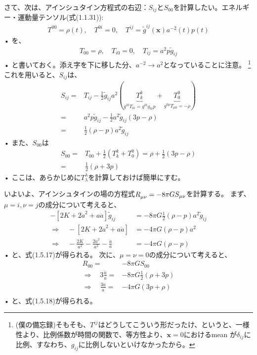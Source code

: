 \documentclass[11pt,a4paper,dvipdfmx]{jsarticle}
\theoremstyle{plain}
\theoremstyle{break}
\begin{document}
さて、次は、アインシュタイン方程式の右辺：$S_{ij}$と$S_{00}$を計算したい。エネルギー・運動量テンソル(式(1.1.31)):
\begin{align}
 T^{00}=\rho(t), \quad T^{0 i}=0, \quad T^{i j}=\tilde{g}^{i j}(\mathbf{x}) a^{-2}(t) p(t)
\end{align}•%
を、
\begin{align}
 T_{00}=\rho, \quad T_{i 0}=0, \quad T_{i j}=a^{2} p \tilde{g}_{i j}
\end{align}•%
と書いておく。添え字を下に移した分、$a^{-2} \rightarrow a^2$となっていることに注意。
\footnote{(僕の備忘録)そもそも、$T^{ij}$はどうしてこういう形だったけ、というと、一様性より、比例係数が時間の関数で、等方性より、$\mathbf{x}=0$におけるmean が$\delta_{ij}$に比例、すなわち、$g_{ij}$に比例しないといけなかったから。}
\\これを用いると、$S_{ij}$は、
\begin{align}
 S_{i j}
 	=&T_{i j}-\frac{1}{2} \tilde{g}_{i j} a^{2}(\underbrace{T_{k}^{k}}_{g^{ik} T_{ki} =g^{ik} g_{ki} p }+\underbrace{T_{0}^{0}}_{g^{0\mu}T_{\mu 0}=- \rho } )\\
 	=&a^{2} p \tilde{g}_{i j}-\frac{1}{2} a^{2} \tilde{g}_{i j}(3 p-\rho)\\
	=&\frac{1}{2}(\rho-p) a^{2} \tilde{g}_{i j}
\end{align}•%
また、$S_{00}$は
\begin{align}
 S_{00}
 	=&T_{00}+\frac{1}{2}\left(T_{k}^{k}+T_{0}^{0}\right)
	=\rho+\frac{1}{2}(3 p-\rho)\\
	=&\frac{1}{2}(\rho+3 p)
\end{align}•%
ここは、あらかじめに$T^\lambda_{\lambda}$を計算しておけば簡単にすむ。

いよいよ、アインシュタインの場の方程式$\tensor{R}{_{\mu \nu}} = -8\pi G S_{\mu \nu}$を計算する。
まず、$\mu = i ,\nu = j$の成分について考えると、
\begin{align}
  -\left[2 K+2 \dot{a}^{2}+a \ddot{a}\right] \tilde{g}_{i j} &=-8\pi G \frac{1}{2}(\rho-p) a^{2} \tilde{g}_{i j} \\
   \Rightarrow  \quad -\left[2 K+2 \dot{a}^{2}+a \ddot{a}\right] &=-4\pi G (\rho-p) a^{2}  \\
   \Rightarrow  \quad -\frac{2 K}{a^{2}}-\frac{2 \dot{a}^{2}}{a^{2}}-\frac{\ddot{a}}{a}&=-4 \pi G(\rho-p)
\end{align}•%
と、式(1.5.17)が得られる。
次に、$\mu = \nu = 0$の成分について考えると、
\begin{align}
  R_{00} =& -8 \pi G S_{00} \\
  \Rightarrow \quad 3 \frac{\ddot{a}}{a} =& -8 \pi G \frac{1}{2} ( \rho + 3 p) \\
  \Rightarrow \quad \frac{3\ddot{a}}{a} =& -4 \pi G  ( 3 p + \rho) \\
\end{align}•%
と、式(1.5.18)が得られる。 \\
\end{document}
